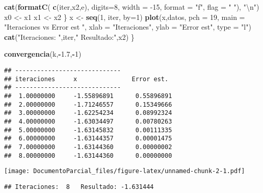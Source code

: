 \documentclass[]{article}
\newenvironment{Shaded}{\begin{snugshade}}{\end{snugshade}}
\newcommand{\CharTok}[1]{\textcolor[rgb]{0.31,0.60,0.02}{#1}}
\newcommand{\DataTypeTok}[1]{\textcolor[rgb]{0.13,0.29,0.53}{#1}}
\newcommand{\DecValTok}[1]{\textcolor[rgb]{0.00,0.00,0.81}{#1}}
\newcommand{\FloatTok}[1]{\textcolor[rgb]{0.00,0.00,0.81}{#1}}
\newcommand{\KeywordTok}[1]{\textcolor[rgb]{0.13,0.29,0.53}{\textbf{#1}}}
\newcommand{\NormalTok}[1]{#1}
\newcommand{\OperatorTok}[1]{\textcolor[rgb]{0.81,0.36,0.00}{\textbf{#1}}}
\newcommand{\StringTok}[1]{\textcolor[rgb]{0.31,0.60,0.02}{#1}}
\begin{document}
\begin{Shaded}
\begin{Highlighting}[]
    \KeywordTok{cat}\NormalTok{(}\KeywordTok{formatC}\NormalTok{( }\KeywordTok{c}\NormalTok{(iter,x2,e), }\DataTypeTok{digits=}\DecValTok{8}\NormalTok{, }\DataTypeTok{width =} \DecValTok{-15}\NormalTok{, }\DataTypeTok{format =} \StringTok{"f"}\NormalTok{, }\DataTypeTok{flag =} \StringTok{" "}\NormalTok{), }\StringTok{"}\CharTok{\textbackslash{}n}\StringTok{"}\NormalTok{) }
\NormalTok{    x0 <-}\StringTok{ }\NormalTok{x1}
\NormalTok{    x1 <-}\StringTok{ }\NormalTok{x2}
\NormalTok{  \}}
\NormalTok{  x <-}\StringTok{ }\KeywordTok{seq}\NormalTok{(}\DecValTok{1}\NormalTok{, iter, }\DataTypeTok{by=}\DecValTok{1}\NormalTok{)}
  \KeywordTok{plot}\NormalTok{(x,datos,}
       \DataTypeTok{pch =} \DecValTok{19}\NormalTok{,}
       \DataTypeTok{main =} \StringTok{"Iteraciones vs Error est "}\NormalTok{,}
       \DataTypeTok{xlab =} \StringTok{"Iteraciones"}\NormalTok{,}
       \DataTypeTok{ylab =} \StringTok{"Error est"}\NormalTok{,}
       \DataTypeTok{type =} \StringTok{"l"}\NormalTok{)}
  \KeywordTok{cat}\NormalTok{(}\StringTok{"Iteraciones: "}\NormalTok{,iter,}\StringTok{"  Resultado:"}\NormalTok{,x2) }
\NormalTok{\}}

\KeywordTok{convergencia}\NormalTok{(k,}\OperatorTok{-}\FloatTok{1.7}\NormalTok{,}\OperatorTok{-}\DecValTok{1}\NormalTok{)}
\end{Highlighting}
\end{Shaded}

\begin{verbatim}
## -----------------------------
## iteraciones     x               Error est.      
## -----------------------------
##  1.00000000     -1.55896891      0.55896891     
##  2.00000000     -1.71246557      0.15349666     
##  3.00000000     -1.62254234      0.08992324     
##  4.00000000     -1.63034497      0.00780263     
##  5.00000000     -1.63145832      0.00111335     
##  6.00000000     -1.63144357      0.00001475     
##  7.00000000     -1.63144360      0.00000002     
##  8.00000000     -1.63144360      0.00000000
\end{verbatim}

\texttt{[image: DocumentoParcial\_files/figure-latex/unnamed-chunk-2-1.pdf]}

\begin{verbatim}
## Iteraciones:  8   Resultado: -1.631444
\end{verbatim}
\end{document}
